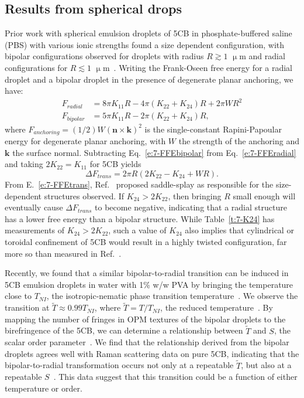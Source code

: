 \subsection{Results from spherical drops}
Prior work with spherical emulsion droplets of 5CB in phosphate-buffered saline (PBS) with various ionic strengths found a size dependent configuration, with bipolar configurations observed for droplets with radius $R \gtrsim 1$ $\upmu$m and radial configurations for $R \lesssim 1$ $\upmu$m~\cite{miller2013influence}.
Writing the Frank-Oseen free energy for a radial droplet and a bipolar droplet in the presence of degenerate planar anchoring, we have:
\begin{align}
  F_{radial} &= 8 \pi K_{11} R - 4 \pi (K_{22} + K_{24}) R + 2 \pi W R^2\label{e:7-FFEradial} \\
  F_{bipolar} &= 5 \pi K_{11} R - 2 \pi (K_{22}+ K_{24}) R,\label{e:7-FFEbipolar}
\end{align}
where $F_{anchoring} = (1/2) W (\mathbf{n} \times \mathbf{k})^2$ is the single-constant Rapini-Papoular energy for degenerate planar anchoring, with $W$ the strength of the anchoring and $\mathbf{k}$ the surface normal.
Subtracting Eq.~\ref{e:7-FFEbipolar} from Eq.~\ref{e:7-FFEradial} and taking $2 K_{22} = K_{11}$ for 5CB yields
\begin{equation}
  \Delta F_{trans} = 2\pi R (2 K_{22}-K_{24} + W R).\label{e:7-FFEtrans}
\end{equation}
From E.~\ref{e:7-FFEtrans}, Ref.~\cite{miller2013influence} proposed saddle-splay as responsible for the size-dependent structures observed.
If $K_{24} > 2 K_{22}$, then bringing $R$ small enough will eventually cause $\Delta F_{trans}$ to become negative, indicating that a radial structure has a lower free energy than a bipolar structure.
While Table~\ref{t:7-K24} has measurements of $K_{24} > 2 K_{22}$, such a value of $K_{24}$ also implies that cylindrical or toroidal confinement of 5CB would result in a highly twisted configuration, far more so than measured in Ref.~\cite{RN24}.

Recently, we found that a similar bipolar-to-radial transition can be induced in 5CB emulsion droplets in water with 1\% w/w PVA by bringing the temperature close to $T_{NI}$, the isotropic-nematic phase transition temperature~\cite{nayani2017role}.
We observe the transition at $\tilde{T} \approx 0.99 T_{NI}$, where $\tilde{T} = T/T_{NI}$, the reduced temperature~\cite{nayani2017role}.
By mapping the number of fringes in OPM textures of the bipolar droplets to the birefringence of the 5CB, we can determine a relationship between $\tilde{T}$ and $S$, the scalar order parameter~\cite{nayani2017role}.
We find that the relationship derived from the bipolar droplets agrees well with Raman scattering data on pure 5CB, indicating that the bipolar-to-radial transformation occurs not only at a repeatable $\tilde{T}$, but also at a repeatable $S$~\cite{nayani2017role}.
This data suggest that this transition could be a function of either temperature or order.

